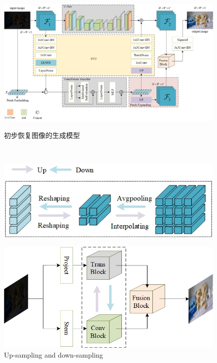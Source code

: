 \documentclass[CJK,aspectratio=169]{beamer}  %
\begin{document}
\begin{frame}
\begin{figure}
\begin{minipage}{.4\textwidth}
\begin{itemize}
				\end{itemize}
				\captionsetup{font=scriptsize}
				\label{fig: Abstract}
			\end{minipage}
			\begin{minipage}{.58\textwidth}
				\centering
				\includegraphics[width=.88\linewidth]{picture/LLIE/My Architecture/The proposed initial architecture.jpg}
				\captionsetup{font=scriptsize}
				\label{fig: PACUT}	
				\caption*{\tiny 初步恢复图像的生成模型}
			\end{minipage}\\
			\hfill
			\begin{minipage}{.28\textwidth}
				\includegraphics[width=.88\linewidth]{picture/LLIE/My Architecture/Up-sampling and down-sampling.jpg}
				\captionsetup{font=scriptsize}
				\label{fig: Up-sampling and down-sampling}	
				\caption*{\tiny Up-sampling and down-sampling}
			\end{minipage}
			\begin{minipage}{.28\textwidth}
				\includegraphics[width=.88\linewidth]{picture/LLIE/My Architecture/The proposed initial architecture(Abstract Picture).jpg}

\end{minipage}
\end{figure}
\end{frame}
\end{document}

